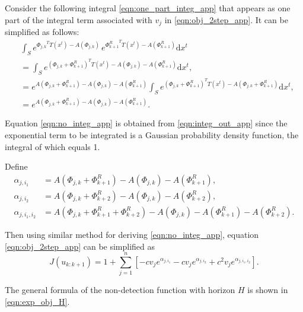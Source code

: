 \documentclass[twocolumn,10pt]{asme2e}
\begin{document}
Consider the following integral \cref{eqn:one_part_integ_app} that appears as one part of the integral term associated with $v_j$ in \cref{eqn:obj_2step_app}.
It can be simplified as follows:
\begin{align}
&\int_S e^{{\Phi_{j,k}}^TT(x^t)-A(\Phi_{j,k})}\,e^{{\Phi^R_{k+1}}^TT(x^t)-A(\Phi^R_{k+1})} \mathrm{d}x^t\label{eqn:one_part_integ_app}\\
&=\int_S e^{{(\Phi_{j,k}+\Phi^R_{k+1})}^TT(x^t)-A(\Phi_{j,k})-A(\Phi^R_{k+1})} \mathrm{d}x^t,\\
&=e^{A(\Phi_{j,k}+\Phi^R_{k+1})-A(\Phi_{j,k})-A(\Phi^R_{k+1})}\int_S e^{(\Phi_{j,k}+\Phi^R_{k+1})^TT(x^t)-A(\Phi_{j,k}+\Phi^R_{k+1})} \mathrm{d}x^t\label{eqn:integ_out_app},\\
&=e^{A(\Phi_{j,k}+\Phi^R_{k+1})-A(\Phi_{j,k})-A(\Phi^R_{k+1})}. \label{eqn:no_integ_app}
\end{align}

Equation \cref{eqn:no_integ_app} is obtained from \cref{eqn:integ_out_app} since the exponential term to be integrated is a Gaussian probability density function, the integral of which equals 1.

Define
\begin{subequations}
	\begin{align*}
	\alpha_{j,i_1}&=A(\Phi_{j,k}+\Phi^R_{k+1})-A(\Phi_{j,k})-A(\Phi^R_{k+1}),\\
	\alpha_{j,i_2}&=A(\Phi_{j,k}+\Phi^R_{k+2})-A(\Phi_{j,k})-A(\Phi^R_{k+2}),\\
	\alpha_{j,i_1,i_2}&=A(\Phi_{j,k}+\Phi^R_{k+1}+\Phi^R_{k+2})-A(\Phi_{j,k})-A(\Phi^R_{k+1})-A(\Phi^R_{k+2}).
	\end{align*}
\end{subequations}

Then using similar method for deriving \cref{eqn:no_integ_app}, equation \cref{eqn:obj_2step_app} can be simplified as
\begin{equation*}
J(u_{k:k+1})=1+\sum\limits_{j=1}^{n}[-cv_je^{\alpha_{j,i_1}}-cv_je^{\alpha_{j,i_2}}+c^2v_je^{\alpha_{j,i_1,i_2}}].
\end{equation*}

The general formula of the non-detection function with horizon $H$ is shown in \cref{eqn:exp_obj_H}.


\end{document}
